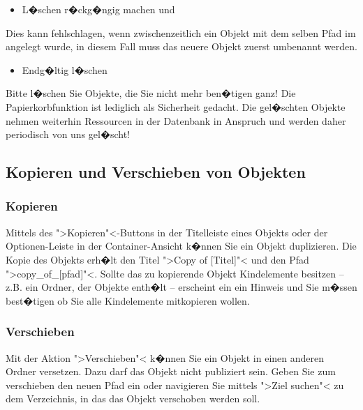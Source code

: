 \begin{itemize}
	\item L�schen r�ckg�ngig machen und 
\end{itemize}

\begin{Hinweis}
  Dies kann fehlschlagen, wenn zwischenzeitlich ein Objekt mit 
  dem selben Pfad 
  im  angelegt wurde,
  in diesem Fall muss das neuere Objekt zuerst umbenannt werden.
\end{Hinweis}

\begin{itemize}
	\item Endg�ltig l�schen
\end{itemize}

\begin{Hinweis}
  Bitte l�schen Sie Objekte, die Sie nicht mehr ben�tigen ganz! Die
  Papierkorbfunktion ist lediglich als Sicherheit gedacht. Die
  gel�schten Objekte nehmen weiterhin Ressourcen in der Datenbank in
  Anspruch und werden daher periodisch von uns gel�scht!
\end{Hinweis}

\subsection{Kopieren und Verschieben von Objekten}
\subsubsection{Kopieren}
Mittels des ">Kopieren"<-Buttons in der Titelleiste eines Objekts oder der Optionen-Leiste in der Container-Ansicht k�nnen Sie ein Objekt duplizieren. Die Kopie des Objekts erh�lt den Titel ">Copy of [Titel]"< und den Pfad ">copy\_of\_[pfad]"<. Sollte das zu kopierende Objekt Kindelemente besitzen -- z.B. ein Ordner, der Objekte enth�lt -- erscheint ein ein Hinweis und Sie m�ssen best�tigen ob Sie alle Kindelemente mitkopieren wollen.

\subsubsection{Verschieben}
Mit der Aktion ">Verschieben"< k�nnen Sie ein Objekt in einen anderen Ordner versetzen. Dazu darf das Objekt nicht publiziert sein. Geben Sie zum verschieben den neuen Pfad ein oder navigieren Sie mittels ">Ziel suchen"< zu dem Verzeichnis, in das das Objekt verschoben werden soll.


